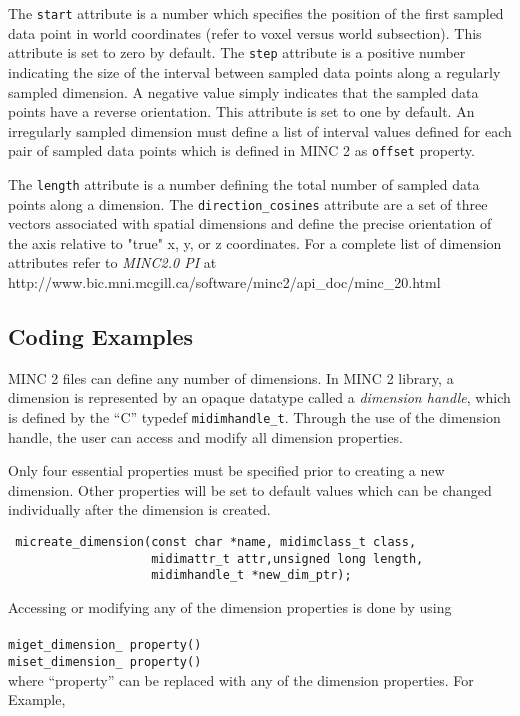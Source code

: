 \documentclass{article}
\begin{document}
The {\tt start} attribute is a number which specifies the position of the first 
sampled data point in world coordinates (refer to voxel versus world subsection).
This attribute is set to zero by default.
The {\tt step} attribute is a positive number indicating the size of the interval
between sampled data points along a regularly sampled dimension. A negative value simply
indicates that the sampled data points have a reverse orientation. This attribute is
set to one by default. 
An irregularly sampled dimension must define a list of interval values defined for each
pair of sampled data points which is defined in MINC 2 as {\tt offset} property. 

The {\tt length} attribute is a number defining the total number of sampled data 
points along a dimension.
The {\tt direction\_cosines} attribute are a set of three vectors associated with 
spatial dimensions and define the precise orientation of the axis relative to "true" 
x, y, or z coordinates. For a complete list of dimension attributes refer to
\emph{MINC2.0 PI} at http://www.bic.mni.mcgill.ca/software/minc2/api\_doc/minc\_20.html


\subsection{Coding Examples}
MINC 2 files can define any number of dimensions. In MINC 2 library, a dimension 
is represented by an opaque datatype
called a \emph{dimension handle}, which is defined by the ``C'' typedef
{\tt midimhandle\_t}. Through the use of the dimension handle, the user can access and 
modify all dimension properties. 

Only four essential properties must be specified prior to creating a new dimension. 
Other properties will be set to default values which can be 
changed individually after the dimension is created.
\begin{verbatim}
 micreate_dimension(const char *name, midimclass_t class, 
                    midimattr_t attr,unsigned long length, 
                    midimhandle_t *new_dim_ptr);
\end{verbatim}
Accessing or modifying any of the dimension properties is done by using \\
\\
{\tt miget\_dimension\_ property() }\\
{\tt miset\_dimension\_ property() } 
\\
where ``property'' can be replaced with any of the dimension properties. 
For Example,
\end{document}
